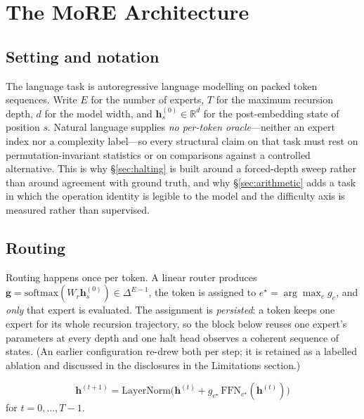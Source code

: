 \section{The MoRE Architecture}
\label{sec:method}

\subsection{Setting and notation}

The language task is autoregressive language modelling on packed token sequences.
Write
$E$ for the number of experts, $T$ for the maximum recursion depth, $d$ for the
model width, and $\mathbf{h}^{(0)}_s \in \mathbb{R}^{d}$ for the post-embedding
state of position $s$. Natural language supplies \emph{no per-token
oracle}---neither an expert index nor a complexity label---so every structural
claim on that task must rest on permutation-invariant statistics or on
comparisons against a controlled alternative. This is why
\S\ref{sec:halting} is built around a forced-depth sweep rather than around
agreement with ground truth, and why \S\ref{sec:arithmetic} adds a task in which
the operation identity is legible to the model and the difficulty axis is
measured rather than supervised.

\subsection{Routing}

Routing happens once per token. A linear router produces
$\mathbf{g} = \mathrm{softmax}(W_r \mathbf{h}^{(0)}_s) \in \Delta^{E-1}$, the
token is assigned to $e^\star = \arg\max_e g_e$, and \emph{only} that expert is
evaluated. The assignment is \emph{persisted}: a token keeps one expert for its
whole recursion trajectory, so the block below reuses one expert's parameters at
every depth and one halt head observes a coherent sequence of states. (An earlier
configuration re-drew both per step; it is retained as a labelled ablation and
discussed in the disclosures in the Limitations section.)

{\dispsize
\begin{equation}
\mathbf{h}^{(t+1)} = \mathrm{LayerNorm}\big(
  \mathbf{h}^{(t)} + g_{e^\star}\,\mathrm{FFN}_{e^\star}(\mathbf{h}^{(t)})
\big)
\label{eq:block}
\end{equation}
}
for $t = 0,\dots,T-1$.

